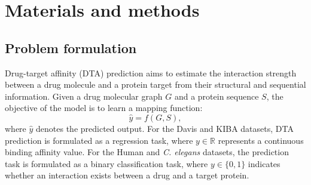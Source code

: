 \documentclass[pdflatex,sn-mathphys-num]{sn-jnl}%
\theoremstyle{thmstyleone}%
\theoremstyle{thmstyletwo}%
\theoremstyle{thmstylethree}%
\begin{document}
\section{Materials and methods}\label{sec3}

\subsection{Problem formulation}\label{subsec:problem_formulation}

Drug-target affinity (DTA) prediction aims to estimate the interaction strength between a drug molecule and a protein target from their structural and sequential information. Given a drug molecular graph $G$ and a protein sequence $S$, the objective of the model is to learn a mapping function:
\begin{equation}
\hat{y}=f(G,S),
\end{equation}
where $\hat{y}$ denotes the predicted output. For the Davis and KIBA datasets, DTA prediction is formulated as a regression task, where $y\in\mathbb{R}$ represents a continuous binding affinity value. For the Human and \textit{C. elegans} datasets, the prediction task is formulated as a binary classification task, where $y\in\{0,1\}$ indicates whether an interaction exists between a drug and a target protein.
\end{document}
